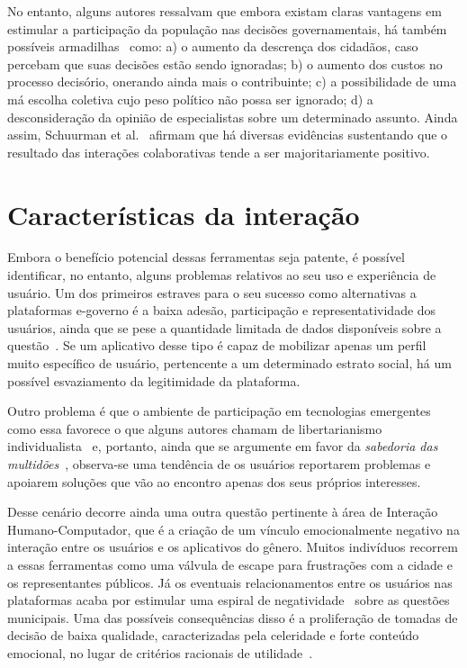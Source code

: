 \documentclass{sigchi}
\begin{document}
No entanto, alguns autores ressalvam que embora existam claras vantagens em estimular a participação da população nas decisões governamentais, há também possíveis armadilhas~\cite{irvin:2004, brabham:2009} como: a) o aumento da descrença dos cidadãos, caso percebam que suas decisões estão sendo ignoradas; b) o aumento dos custos no processo decisório, onerando ainda mais o contribuinte; c) a possibilidade de uma má escolha coletiva cujo peso político não possa ser ignorado; d) a desconsideração da opinião de especialistas sobre um determinado assunto. Ainda assim, Schuurman et al.~\cite{schuurman:2012} afirmam que há diversas evidências sustentando que o resultado das interações colaborativas tende a ser majoritariamente positivo.

\section{Características da interação}
Embora o benefício potencial dessas ferramentas seja patente, é possível identificar, no entanto, alguns problemas relativos ao seu uso e experiência de usuário. Um dos primeiros estraves para o seu sucesso como alternativas a plataformas e-governo é a baixa adesão, participação e representatividade dos usuários, ainda que se pese a quantidade limitada de dados disponíveis sobre a questão~\cite{colab_recife:2016}. Se um aplicativo desse tipo é capaz de mobilizar apenas um perfil muito específico de usuário, pertencente a um determinado estrato social, há um possível esvaziamento da legitimidade da plataforma.

Outro problema é que o ambiente de participação em tecnologias emergentes como essa favorece o que alguns autores chamam de libertarianismo individualista~\cite{brabham:2008} e, portanto, ainda que se argumente em favor da \textit{sabedoria das multidões}~\cite{surowiecki:2005}, observa-se uma tendência de os usuários reportarem problemas e apoiarem soluções que vão ao encontro apenas dos seus próprios interesses.

Desse cenário decorre ainda uma outra questão pertinente à área de Interação Humano-Computador, que é a criação de um vínculo emocionalmente negativo na interação entre os usuários e os aplicativos do gênero. Muitos indivíduos recorrem a essas ferramentas como uma válvula de escape para frustrações com a cidade e os representantes públicos. Já os eventuais relacionamentos entre os usuários nas plataformas acaba por estimular uma espiral de negatividade~\cite{slater:2007} sobre as questões municipais. Uma das possíveis consequências disso é a proliferação de tomadas de decisão de baixa qualidade, caracterizadas pela celeridade e forte conteúdo emocional, no lugar de critérios racionais de utilidade~\cite{tversky:1986}.
\end{document}
